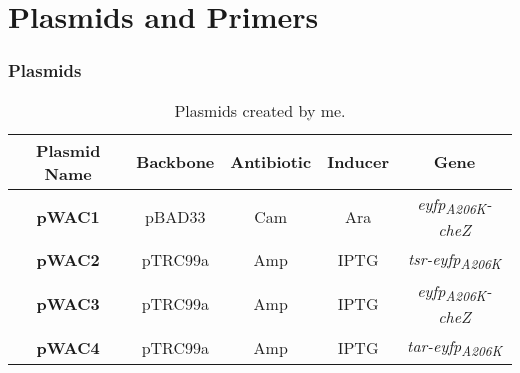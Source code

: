 \documentclass[../main.tex]{subfiles}
\begin{document}
\setcounter{section}{0}
\part{Plasmids and Primers}

\section{Plasmids}
\begin{table}[h!]
\begin{center}
\begin{tabular}{c|c|c|c|c}
\textbf{Plasmid Name} 	&	\textbf{Backbone}	&	\textbf{Antibiotic}	&		\textbf{Inducer}	&	\textbf{Gene}\\\hline
\textbf{pWAC1}			&	pBAD33				&	Cam					&		Ara				&	\textit{eyfp\textsubscript{A206K}-cheZ}\\
\textbf{pWAC2}			&	pTRC99a				&	Amp					&		IPTG				&	\textit{tsr-eyfp\textsubscript{A206K}}\\
\textbf{pWAC3}			&	pTRC99a				&	Amp					&		IPTG				&	\textit{eyfp\textsubscript{A206K}-cheZ}\\
\textbf{pWAC4}			&	pTRC99a				&	Amp					&		IPTG				&	\textit{tar-eyfp\textsubscript{A206K}}
\end{tabular}
\caption{Plasmids created by me.}
\label{tbl:myplasmids}
\end{center}
\end{table}
\end{document}
